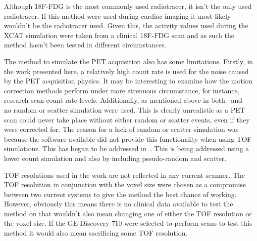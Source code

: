         Although \gls{18F-FDG} is the most commonly used radiotracer, it isn't the only used radiotracer. If this method were used during cardiac imaging it most likely wouldn't be the radiotracer used. Given this, the activity values used during the \gls{XCAT} simulation were taken from a clinical \gls{18F-FDG} scan and as such the method hasn't been tested in different circumstances.
        
        The method to simulate the \gls{PET} acquisition also has some limitations. Firstly, in the work presented here, a relatively high count rate is used for the noise caused by the \gls{PET} acquisition physics. It may be interesting to examine how the motion correction methods perform under more strenuous circumstance, for instance, research scan count rate levels. Additionally, as mentioned above in both~ and~ no random or scatter simulation were used. This is clearly unrealistic as a \gls{PET} scan could never take place without either random or scatter events, even if they were corrected for. The reason for a lack of random or scatter simulation was because the software available did not provide this functionality when using \gls{TOF} simulations. This has begun to be addressed in~. This is being addressed using a lower count simulation and also by including pseudo-random and scatter.
        
        \gls{TOF} resolutions used in the work are not reflected in any current scanner. The \gls{TOF} resolution in conjunction with the voxel size were chosen as a compromise between two current systems to give the method the best chance of working. However, obviously this means there is no clinical data available to test the method on that wouldn't also mean changing one of either the \gls{TOF} resolution or the voxel size. If the \gls{GE} Discovery $710$ were selected to perform scans to test this method it would also mean sacrificing some \gls{TOF} resolution.
        
